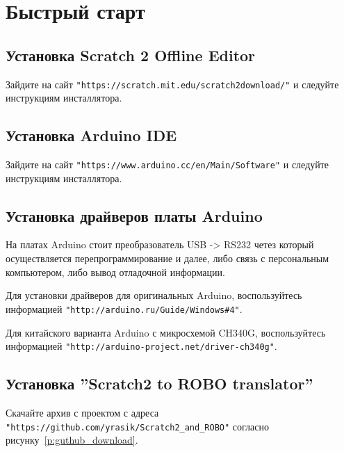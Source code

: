 \section{Быстрый старт}


\subsection{Установка Scratch 2 Offline Editor}
Зайдите на сайт \verb|"https://scratch.mit.edu/scratch2download/"| и следуйте инструкциям инсталлятора.


\subsection{Установка Arduino IDE}
Зайдите на сайт \verb|"https://www.arduino.cc/en/Main/Software"| и следуйте инструкциям инсталлятора.


\subsection{Установка драйверов платы Arduino}
На платах Arduino стоит преобразователь USB -> RS232 четез который осуществляется перепрограммирование и далее, либо связь с персональным компьютером, либо вывод отладочной информации.

Для установки драйверов для оригинальных Arduino, воспользуйтесь
информацией \verb|"http://arduino.ru/Guide/Windows#4"|.

Для китайского варианта Arduino с микросхемой CH340G, воспользуйтесь информацией \verb|"http://arduino-project.net/driver-ch340g"|.



\subsection{Установка ''Scratch2 to ROBO translator''}

Скачайте архив с проектом с адреса \verb|"https://github.com/yrasik/Scratch2_and_ROBO"| согласно рисунку~\ref{p:guthub_download}.

